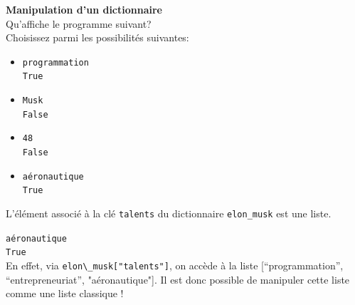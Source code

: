     \begin{Exercice}[5 minutes] [Python] \textbf{Manipulation d'un dictionnaire}\\
      	Qu'affiche le programme suivant? \\
       
        
      	
      	Choisissez parmi les possibilités suivantes: \\
      	
      	\begin{itemize}
            \item[(A)] \texttt{programmation} \\ \texttt{True}
            \item[(B)] \texttt{Musk} \\ \texttt{False}
            \item[(C)] \texttt{48} \\ \texttt{False}
            \item[(D)] \texttt{aéronautique} \\ \texttt{True}
        \end{itemize}
    
        \begin{conseil}
            L'élément associé à la clé \lstinline{talents} du dictionnaire \lstinline{elon_musk} est une liste.
        \end{conseil}
        
        \begin{solution}
            \texttt{aéronautique} \\
            \texttt{True} \\
            
            En effet, via \lstinline{elon\_musk["talents"]}, on accède à la liste [``programmation'', ``entrepreneuriat'', "aéronautique"]. Il est donc possible de manipuler cette liste comme une liste classique !
        \end{solution}
    \end{Exercice}

